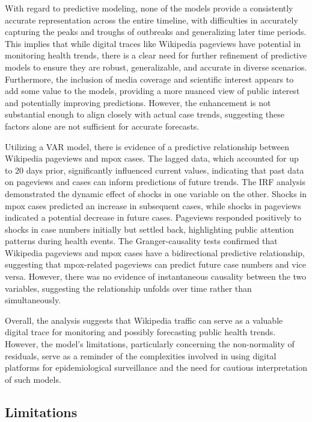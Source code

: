 \documentclass[
  12pt,
]{article}
\begin{document}
With regard to predictive modeling, none of the models provide a
consistently accurate representation across the entire timeline, with
difficulties in accurately capturing the peaks and troughs of outbreaks
and generalizing later time periods. This implies that while digital
traces like Wikipedia pageviews have potential in monitoring health
trends, there is a clear need for further refinement of predictive
models to ensure they are robust, generalizable, and accurate in diverse
scenarios. Furthermore, the inclusion of media coverage and scientific
interest appears to add some value to the models, providing a more
nuanced view of public interest and potentially improving predictions.
However, the enhancement is not substantial enough to align closely with
actual case trends, suggesting these factors alone are not sufficient
for accurate forecasts.

Utilizing a VAR model, there is evidence of a predictive relationship
between Wikipedia pageviews and mpox cases. The lagged data, which
accounted for up to 20 days prior, significantly influenced current
values, indicating that past data on pageviews and cases can inform
predictions of future trends. The IRF analysis demonstrated the dynamic
effect of shocks in one variable on the other. Shocks in mpox cases
predicted an increase in subsequent cases, while shocks in pageviews
indicated a potential decrease in future cases. Pageviews responded
positively to shocks in case numbers initially but settled back,
highlighting public attention patterns during health events. The
Granger-causality tests confirmed that Wikipedia pageviews and mpox
cases have a bidirectional predictive relationship, suggesting that
mpox-related pageviews can predict future case numbers and vice versa.
However, there was no evidence of instantaneous causality between the
two variables, suggesting the relationship unfolds over time rather than
simultaneously.

Overall, the analysis suggests that Wikipedia traffic can serve as a
valuable digital trace for monitoring and possibly forecasting public
health trends. However, the model's limitations, particularly concerning
the non-normality of residuals, serve as a reminder of the complexities
involved in using digital platforms for epidemiological surveillance and
the need for cautious interpretation of such models.

\subsection{Limitations}\label{limitations}
\end{document}

